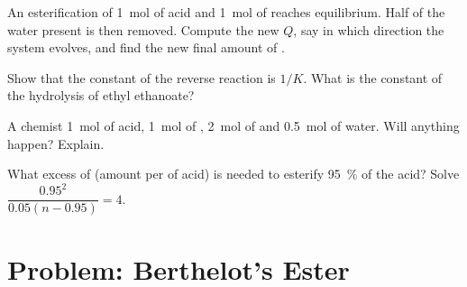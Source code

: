 \begin{exercise}[$\star\star\star$]\label{exo:g12:equilibrium:12}
An esterification of \qty{1}{mol} of acid and \qty{1}{mol} of 
reaches equilibrium. Half of the water present is then removed. Compute
the new $Q$, say in which direction the system evolves, and find the new
final amount of .
\end{exercise}

\begin{exercise}[$\star\star\star$]\label{exo:g12:equilibrium:13}
Show that the constant of the reverse reaction is $1/K$. What is the
constant of the hydrolysis of ethyl ethanoate?
\end{exercise}

\begin{exercise}[$\star\star\star$]\label{exo:g12:equilibrium:14}
A chemist  \qty{1}{mol} of acid, \qty{1}{mol} of ,
\qty{2}{mol} of  and \qty{0.5}{mol} of water. Will anything happen?
Explain.
\end{exercise}

\begin{exercise}[$\star\star\star$]\label{exo:g12:equilibrium:15}
What excess of  (amount per  of acid) is needed to esterify
\qty{95}{\percent} of the acid? Solve $\dfrac{0.95^2}{0.05(n - 0.95)} =
4$.
\end{exercise}

\section{Problem: Berthelot's Ester}

